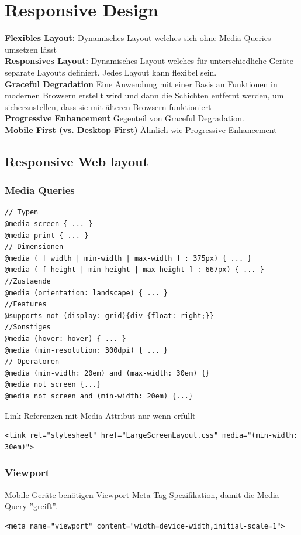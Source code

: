 
\section{Responsive Design}

\textbf{Flexibles Layout:} Dynamisches Layout welches sich ohne Media-Queries umsetzen lässt\\
\textbf{Responsives Layout:} Dynamisches Layout welches für unterschiedliche Geräte separate Layouts definiert. Jedes Layout kann flexibel sein.\\
\textbf{Graceful Degradation} Eine Anwendung mit einer Basis an Funktionen in modernen Browsern erstellt wird und dann die Schichten entfernt werden, um sicherzustellen, dass sie mit älteren Browsern funktioniert\\
\textbf{Progressive Enhancement} Gegenteil von Graceful Degradation.\\
\textbf{Mobile First (vs. Desktop First)} Ähnlich wie Progressive Enhancement


\subsection{Responsive Web layout}
\subsubsection{Media Queries}
\begin{lstlisting}
// Typen
@media screen { ... }
@media print { ... }
// Dimensionen
@media ( [ width | min-width | max-width ] : 375px) { ... }
@media ( [ height | min-height | max-height ] : 667px) { ... }
//Zustaende
@media (orientation: landscape) { ... }
//Features
@supports not (display: grid){div {float: right;}}
//Sonstiges
@media (hover: hover) { ... }
@media (min-resolution: 300dpi) { ... }
// Operatoren
@media (min-width: 20em) and (max-width: 30em) {}
@media not screen {...}
@media not screen and (min-width: 20em) {...}
\end{lstlisting}
Link Referenzen mit Media-Attribut nur wenn erfüllt
\begin{lstlisting}
<link rel="stylesheet" href="LargeScreenLayout.css" media="(min-width: 30em)">
\end{lstlisting}

\subsubsection{Viewport}
Mobile Geräte benötigen Viewport Meta-Tag Spezifikation, damit die Media-Query ''greift''.
\begin{lstlisting}
<meta name="viewport" content="width=device-width,initial-scale=1">
\end{lstlisting}


